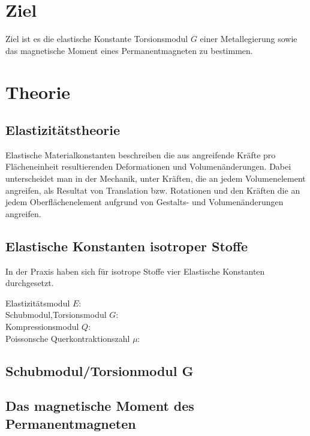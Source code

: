 \section{Ziel}
Ziel ist es die elastische Konstante Torsionsmodul $G$ einer Metallegierung sowie das magnetische Moment eines Permanentmagneten zu bestimmen.


\section{Theorie}
\subsection{Elastizitätstheorie}
Elastische Materialkonstanten beschreiben die aus angreifende Kräfte pro Flächeneinheit resultierenden Deformationen und Volumenänderungen.
Dabei unterscheidet man in der Mechanik, unter Kräften, die an jedem Volumenelement angreifen, als Resultat von Translation bzw. Rotationen und
den Kräften die an jedem Oberflächenelement aufgrund von Gestalts- und Volumenänderungen angreifen.



\subsection{Elastische Konstanten isotroper Stoffe}
In der Praxis haben sich für isotrope Stoffe vier Elastische Konstanten durchgesetzt.\\
\begin{description}
\item[Elastizitätsmodul $E$:]
\item[Schubmodul,Torsionsmodul $G$:]
\item[Kompressionsmodul $Q$:]
\item[Poissonsche Querkontraktionszahl $\mu$:]
\end{description}

\subsection{Schubmodul/Torsionmodul G}
\subsection{Das magnetische Moment des Permanentmagneten}
\label{sec:Theorie}

